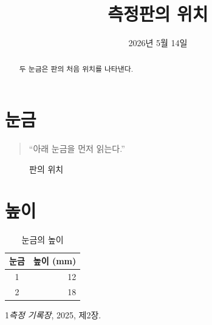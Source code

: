 \documentclass{oblivoir}
\begin{document}
\title{측정판의 위치}\author{}\date{2026년 5월 14일}\maketitle
\begin{abstract}두 눈금은 판의 처음 위치를 나타낸다.\end{abstract}
\tableofcontents
\section{눈금}\begin{quote}“아래 눈금을 먼저 읽는다.”\end{quote}
\begin{figure}[ht]\centering\fbox{\rule{0pt}{8mm}\rule{33mm}{0pt}}\caption{판의 위치}\end{figure}
\section{높이}
\begin{table}[ht]\centering\begin{tabular}{cr}눈금&높이 (mm)\\\hline 1&12\\2&18\end{tabular}\caption{눈금의 높이}\end{table}
\begin{thebibliography}{1}\emph{측정 기록장}, 2025, 제2장.\end{thebibliography}
\end{document}
